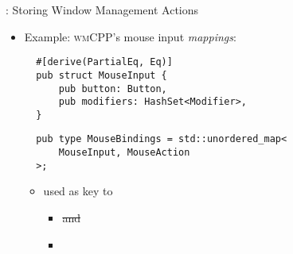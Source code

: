 \begin{frame}[fragile]{\underline{\cpp}: Storing Window Management Actions \hfill {\footnotesize \currentname}}


    \begin{itemize}

        \item Example: \textsc{wmCPP}'s mouse input \textit{mappings}:\\[3pt]
\begin{verbatim}
  #[derive(PartialEq, Eq)]
  pub struct MouseInput {
      pub button: Button,
      pub modifiers: HashSet<Modifier>,
  }
\end{verbatim}
\begin{verbatim}
  pub type MouseBindings = std::unordered_map<
      MouseInput, MouseAction
  >;
\end{verbatim}

    \vspace*{5pt}\begin{itemize}

        \item {} used as key to 
            \begin{itemize}
                \item \sout<2>{ and } 
                \item {} 
            \end{itemize}

    \end{itemize}

    \end{itemize}

    \vfill

\end{frame}

